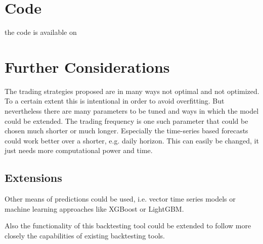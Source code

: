 \chapter{Code}
the code is available on 

\chapter{Further Considerations}
The trading strategies proposed are in many ways not optimal and not optimized. To a certain extent this is intentional in order to avoid overfitting. But nevertheless there are many parameters to be tuned and ways in which the model could be extended. The trading frequency is one such parameter that could be chosen much shorter or much longer. Especially the time-series based forecasts could work better over a shorter, e.g. daily horizon. This can easily be changed, it just needs more computational power and time. 

\section{Extensions}
Other means of predictions could be used, i.e. vector time series models or machine learning approaches like XGBoost or LightGBM.  

Also the functionality of this backtesting tool could be extended to follow more closely the capabilities of existing backtesting tools. 
